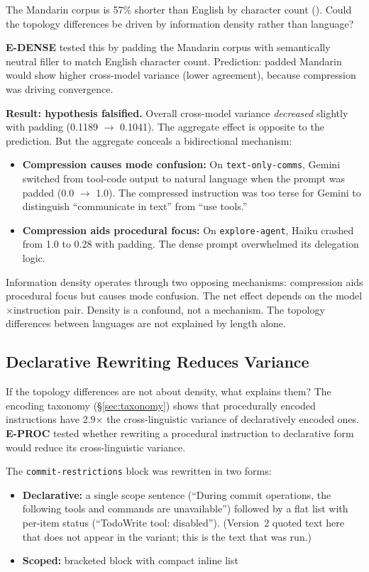 \documentclass[11pt,a4paper]{article}
\begin{document}
The Mandarin corpus is 57\% shorter than English by character count
(). Could the topology differences be driven
by information density rather than language?

\textbf{E-DENSE} tested this by padding the Mandarin corpus with
semantically neutral filler to match English character count.
Prediction: padded Mandarin would show higher cross-model variance
(lower agreement), because compression was driving convergence.

\textbf{Result: hypothesis falsified.} Overall cross-model variance
\emph{decreased} slightly with padding (0.1189 $\to$ 0.1041). The
aggregate effect is opposite to the prediction. But the aggregate
conceals a bidirectional mechanism:

\begin{itemize}[nosep]
\item \textbf{Compression causes mode confusion:} On
  \texttt{text-only-comms}, Gemini switched from tool-code output to
  natural language when the prompt was padded (0.0 $\to$ 1.0). The
  compressed instruction was too terse for Gemini to distinguish
  ``communicate in text'' from ``use tools.''
\item \textbf{Compression aids procedural focus:} On
  \texttt{explore-agent}, Haiku crashed from 1.0 to 0.28 with
  padding. The dense prompt overwhelmed its delegation logic.
\end{itemize}

Information density operates through two opposing mechanisms:
compression aids procedural focus but causes mode confusion.
The net effect depends on the model$\times$instruction pair. Density
is a confound, not a mechanism. The topology differences between
languages are not explained by length alone.

\subsection{Declarative Rewriting Reduces Variance}
\label{sec:eproc}

If the topology differences are not about density, what explains them?
The encoding taxonomy (\S\ref{sec:taxonomy}) shows that procedurally
encoded instructions have 2.9$\times$ the cross-linguistic variance
of declaratively encoded ones. \textbf{E-PROC} tested whether
rewriting a procedural instruction to declarative form would reduce
its cross-linguistic variance.

The \texttt{commit-restrictions} block was rewritten in two forms:
\begin{itemize}[nosep]
\item \textbf{Declarative:} a single scope sentence (``During commit
  operations, the following tools and commands are unavailable'')
  followed by a flat list with per-item status (``TodoWrite tool:
  disabled''). (Version~2 quoted text here that does not appear in the
  variant; this is the text that was run.)
\item \textbf{Scoped:} bracketed block with compact inline list
\end{itemize}
\end{document}
